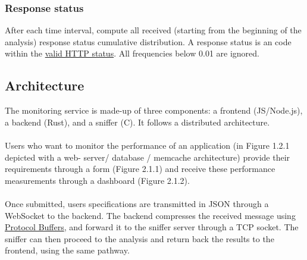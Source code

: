 \documentclass[12pt,hidelinks]{article}
\begin{document}
\subsubsection{Response status}

After each time interval, compute all received (starting from the beginning of the analysis) response status cumulative distribution. 
A response status is an code within the \href{https://developer.mozilla.org/en-US/docs/Web/HTTP/Status}{valid HTTP status}. All frequencies below 0.01 are ignored.


\subsection{Architecture}
	The monitoring service is made-up of three components: a frontend (JS/Node.js), a backend (Rust), and a sniffer (C). It follows a distributed architecture. \\
	\\
	Users who want to monitor the performance of an application (in Figure 1.2.1 depicted with a web-
	server/ database / memcache architecture) provide their requirements through a form (Figure 2.1.1) and 
	receive these performance measurements through a dashboard (Figure 2.1.2).  \\
	\\
	Once submitted, users specifications are transmitted in JSON through a WebSocket to the backend.
	The backend compresses the received message using \href{https://developers.google.com/protocol-buffers/}{Protocol Buffers}, and forward it to the sniffer server through a TCP socket.
	The sniffer can then proceed to the analysis and return back the results to the frontend, using the same pathway.
\end{document}
